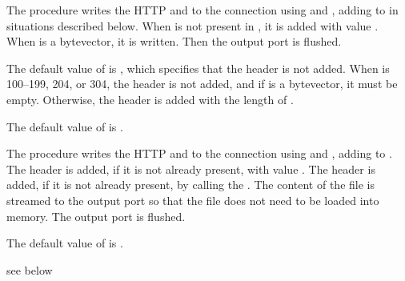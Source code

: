 \begin{procedure}
\end{procedure}
\returns{} 

The  procedure writes the HTTP  and
 to the connection  using
 and , adding
 to  in situations described
below. When  is not present in ,
it is added with value . When  is a
bytevector, it is written. Then the output port is flushed.

The default value of  is , which specifies that
the  header is not added. When  is
100--199, 204, or 304, the  header is not added,
and if  is a bytevector, it must be empty. Otherwise, the
 header is added with the length of
.

The default value of  is .

\begin{procedure}
\end{procedure}
\returns{} 

The  procedure writes the HTTP 
and  to the connection  using
 and , adding
 to .  The 
header is added, if it is not already present, with value
.  The  header is added, if it
is not already present, by calling the .  The
content of the file is streamed to the output port so that the file
does not need to be loaded into memory. The output port is flushed.

The default value of  is .

\begin{procedure}
\end{procedure}
\returns{} see below

